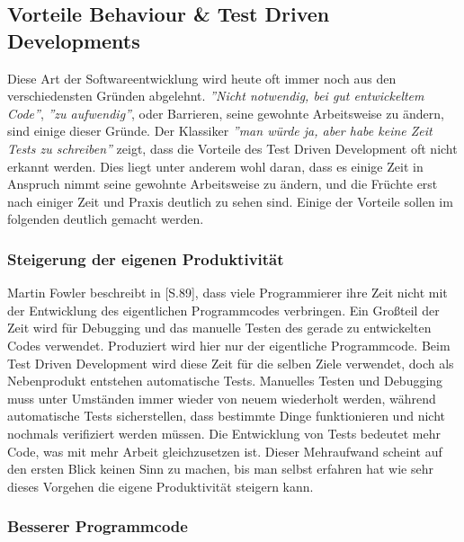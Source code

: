 \subsection{Vorteile Behaviour \& Test Driven Developments}

Diese Art der Softwareentwicklung wird heute oft immer noch aus den
verschiedensten Gründen abgelehnt. \textit{''Nicht notwendig, bei gut
  entwickeltem Code''}, \textit{''zu aufwendig''}, oder Barrieren,
seine gewohnte Arbeitsweise zu ändern, sind einige dieser Gründe. Der
Klassiker \textit{''man würde ja, aber habe keine Zeit Tests zu
  schreiben''} zeigt, dass die Vorteile des Test Driven Development
oft nicht erkannt werden. Dies liegt unter anderem wohl daran, dass es
einige Zeit in Anspruch nimmt seine gewohnte Arbeitsweise zu ändern,
und die Früchte erst nach einiger Zeit und Praxis deutlich zu sehen
sind. Einige der Vorteile sollen im folgenden deutlich gemacht werden.

\subsubsection{Steigerung der eigenen Produktivität}

Martin Fowler beschreibt in \cite{fowler99refactoring}[S.89], dass
viele Programmierer ihre Zeit nicht mit der Entwicklung des
eigentlichen Programmcodes verbringen. Ein Großteil der Zeit wird für
Debugging und das manuelle Testen des gerade zu entwickelten Codes
verwendet. Produziert wird hier nur der eigentliche Programmcode. Beim
Test Driven Development wird diese Zeit für die selben Ziele
verwendet, doch als Nebenprodukt entstehen automatische
Tests. Manuelles Testen und Debugging muss unter Umständen immer
wieder von neuem wiederholt werden, während automatische Tests
sicherstellen, dass bestimmte Dinge funktionieren und nicht nochmals
verifiziert werden müssen. Die Entwicklung von Tests bedeutet mehr
Code, was mit mehr Arbeit gleichzusetzen ist. Dieser Mehraufwand
scheint auf den ersten Blick keinen Sinn zu machen, bis man selbst
erfahren hat wie sehr dieses Vorgehen die eigene Produktivität
steigern kann.

\subsubsection{Besserer Programmcode}

